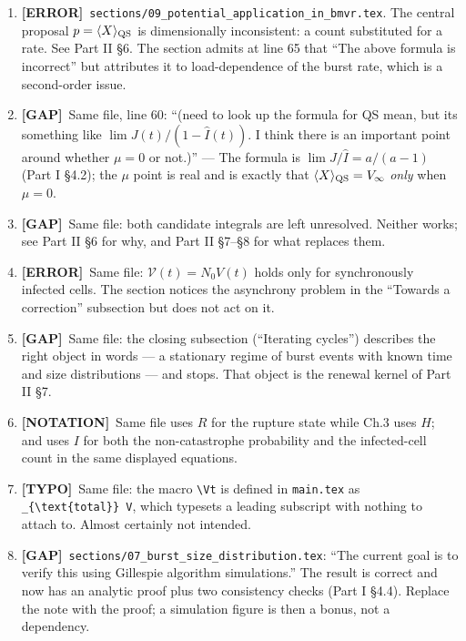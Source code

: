 \documentclass[11pt]{article}
\newcommand{\Ihat}{\widehat{I}}
\newcommand{\Vfree}{\mathcal{V}}
\theoremstyle{plain}
\theoremstyle{definition}
\theoremstyle{remark}
\newcommand{\ERR}{\textcolor{red!70!black}{\textbf{[ERROR]}}}
\newcommand{\GAP}{\textcolor{orange!80!black}{\textbf{[GAP]}}}
\newcommand{\NOT}{\textcolor{blue!60!black}{\textbf{[NOTATION]}}}
\newcommand{\TYP}{\textcolor{gray!80!black}{\textbf{[TYPO]}}}
\begin{document}
\begin{enumerate}[leftmargin=2.2em,label=\textbf{4.\arabic*}]
\item \ERR\ \texttt{sections/09\_potential\_application\_in\_bmvr.tex}.
The central proposal $p=\langle X\rangle_{\rm QS}$ is dimensionally inconsistent:
a count substituted for a rate. See Part II \S6. The section admits at line 65 that
``The above formula is incorrect'' but attributes it to load-dependence of the burst
rate, which is a second-order issue.

\item \GAP\ Same file, line 60: ``(need to look up the formula for QS mean, but its
something like $\lim J(t)/(1-\Ihat(t))$. I think there is an important point around
whether $\mu=0$ or not.)'' --- The formula is $\lim J/\Ihat=a/(a-1)$
(Part I \S4.2); the $\mu$ point is real and is exactly that
$\langle X\rangle_{\rm QS}=V_\infty$ \emph{only} when $\mu=0$.

\item \GAP\ Same file: both candidate integrals are left unresolved. Neither works;
see Part II \S6 for why, and Part II \S7--\S8 for what replaces them.

\item \ERR\ Same file: $\Vfree(t)=N_0V(t)$ holds only for synchronously infected cells.
The section notices the asynchrony problem in the ``Towards a correction'' subsection but
does not act on it.

\item \GAP\ Same file: the closing subsection (``Iterating cycles'') describes the right
object in words --- a stationary regime of burst events with known time and size
distributions --- and stops. That object is the renewal kernel of Part II \S7.

\item \NOT\ Same file uses $R$ for the rupture state while Ch.3 uses $H$; and uses
$I$ for both the non-catastrophe probability and the infected-cell count in the same
displayed equations.

\item \TYP\ Same file: the macro \verb|\Vt| is defined in \texttt{main.tex} as
\verb|_{\text{total}} V|, which typesets a leading subscript with nothing to attach to.
Almost certainly not intended.

\item \GAP\ \texttt{sections/07\_burst\_size\_distribution.tex}: ``The current goal is to
verify this using Gillespie algorithm simulations.'' The result is correct and now has an
analytic proof plus two consistency checks (Part I \S4.4). Replace the note with the
proof; a simulation figure is then a bonus, not a dependency.


\end{enumerate}
\end{document}
